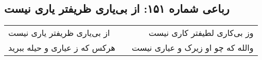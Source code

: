 \begin{center}
\section*{رباعی شماره ۱۵۱: از بی‌یاری ظریفتر یاری نیست}
\label{sec:0151}
\begin{longtable}{l p{0.5cm} r}
از بی‌یاری ظریفتر یاری نیست
&&
وز بی‌کاری لطیفتر کاری نیست
\\
هرکس که ز عیاری و حیله ببرید
&&
والله که چو او زیرک و عیاری نیست
\\
\end{longtable}
\end{center}

